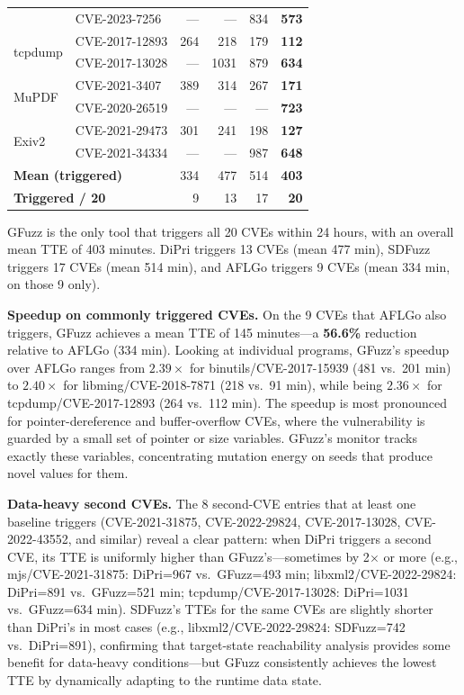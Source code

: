 \documentclass[preprint,12pt,3p]{elsarticle}
\begin{document}
\begin{table}[t]
\begin{tabular}{llrrrr}
  & CVE-2023-7256  & ---  & ---  & 834  & \textbf{573} \\[2pt]
\multirow{2}{*}{tcpdump}
  & CVE-2017-12893 & 264  & 218  & 179  & \textbf{112} \\
  & CVE-2017-13028 & ---  & 1031 & 879  & \textbf{634} \\[2pt]
\multirow{2}{*}{MuPDF}
  & CVE-2021-3407  & 389  & 314  & 267  & \textbf{171} \\
  & CVE-2020-26519 & ---  & ---  & ---  & \textbf{723} \\[2pt]
\multirow{2}{*}{Exiv2}
  & CVE-2021-29473 & 301  & 241  & 198  & \textbf{127} \\
  & CVE-2021-34334 & ---  & ---  & 987  & \textbf{648} \\
\midrule
\multicolumn{2}{l}{\textbf{Mean (triggered)}} & 334 & 477 & 514 & \textbf{403} \\
\multicolumn{2}{l}{\textbf{Triggered / 20}}  & 9   & 13  & 17  & \textbf{20}  \\
\bottomrule
\end{tabular}
\end{table}

GFuzz is the only tool that triggers all 20 CVEs within 24 hours, with an
overall mean TTE of 403 minutes.  DiPri triggers 13 CVEs (mean 477 min),
SDFuzz triggers 17 CVEs (mean 514 min), and AFLGo triggers 9 CVEs (mean
334 min, on those 9 only).

\textbf{Speedup on commonly triggered CVEs.}
On the 9 CVEs that AFLGo also triggers, GFuzz achieves a mean TTE of
145 minutes---a \textbf{56.6\%} reduction relative to AFLGo (334 min).
Looking at individual programs, GFuzz's speedup over AFLGo ranges from
$2.39\times$ for binutils/CVE-2017-15939 (481 vs.\ 201 min) to
$2.40\times$ for libming/CVE-2018-7871 (218 vs.\ 91 min), while being
$2.36\times$ for tcpdump/CVE-2017-12893 (264 vs.\ 112 min).  The speedup
is most pronounced for pointer-dereference and buffer-overflow CVEs, where
the vulnerability is guarded by a small set of pointer or size variables.
GFuzz's monitor tracks exactly these variables, concentrating mutation
energy on seeds that produce novel values for them.

\textbf{Data-heavy second CVEs.}
The 8 second-CVE entries that at least one baseline triggers
(CVE-2021-31875, CVE-2022-29824, CVE-2017-13028, CVE-2022-43552, and
similar) reveal a clear pattern: when DiPri triggers a second CVE, its
TTE is uniformly higher than GFuzz's---sometimes by 2$\times$ or more
(e.g., mjs/CVE-2021-31875: DiPri=967 vs.\ GFuzz=493 min;
libxml2/CVE-2022-29824: DiPri=891 vs.\ GFuzz=521 min;
tcpdump/CVE-2017-13028: DiPri=1031 vs.\ GFuzz=634 min).  SDFuzz's TTEs
for the same CVEs are slightly shorter than DiPri's in most cases
(e.g., libxml2/CVE-2022-29824: SDFuzz=742 vs.\ DiPri=891), confirming that
target-state reachability analysis provides some benefit for data-heavy
conditions---but GFuzz consistently achieves the lowest TTE by dynamically
adapting to the runtime data state.
\end{document}
